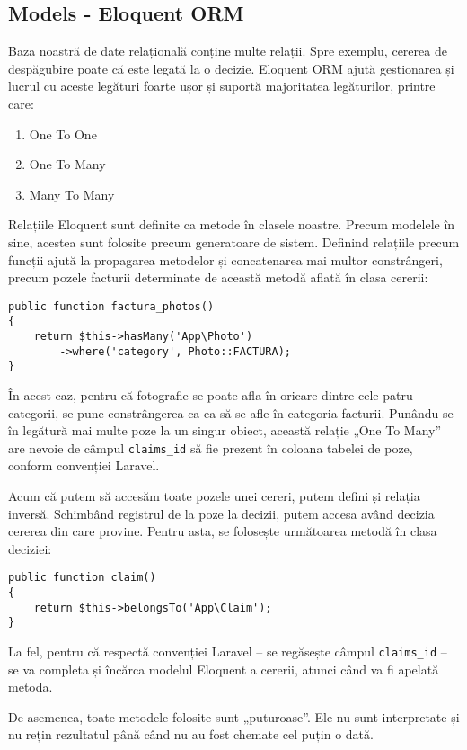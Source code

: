 \subsection{Models - Eloquent ORM}

	Baza noastră de date relațională conține multe relații.
	Spre exemplu, cererea de despăgubire poate că este legată la o decizie.
	Eloquent ORM ajută gestionarea și lucrul cu aceste legături foarte ușor și suportă majoritatea legăturilor, printre care:
	\begin{enumerate}
		\item One To One
		\item One To Many
		\item Many To Many
	\end{enumerate}

	Relațiile Eloquent sunt definite ca metode în clasele noastre.
	Precum modelele în sine, acestea sunt folosite precum generatoare de sistem.
	Definind relațiile precum funcții ajută la propagarea metodelor și concatenarea mai multor constrângeri, precum pozele facturii determinate de această metodă aflată în clasa cererii:
\begin{Verbatim}
public function factura_photos()
{
	return $this->hasMany('App\Photo')
		->where('category', Photo::FACTURA);
}
\end{Verbatim}
	În acest caz, pentru că fotografie se poate afla în oricare dintre cele patru categorii, se pune constrângerea ca ea să se afle în categoria facturii.
	Punându-se în legătură mai multe poze la un singur obiect, această relație „One To Many” are nevoie de câmpul \verb|claims_id| să fie prezent în coloana tabelei de poze, conform convenției Laravel. \cite{laravel_relationships}

	Acum că putem să accesăm toate pozele unei cereri, putem defini și relația inversă.
	Schimbând registrul de la poze la decizii, putem accesa având decizia cererea din care provine.
	Pentru asta, se folosește următoarea metodă în clasa deciziei:
\begin{Verbatim}
public function claim()
{
	return $this->belongsTo('App\Claim');
}
\end{Verbatim}
	La fel, pentru că respectă convenției Laravel -- se regăsește câmpul \verb|claims_id| -- se va completa și încărca modelul Eloquent a cererii, atunci când va fi apelată metoda.

	De asemenea, toate metodele folosite sunt „puturoase”.
	Ele nu sunt interpretate și nu rețin rezultatul până când nu au fost chemate cel puțin o dată.

